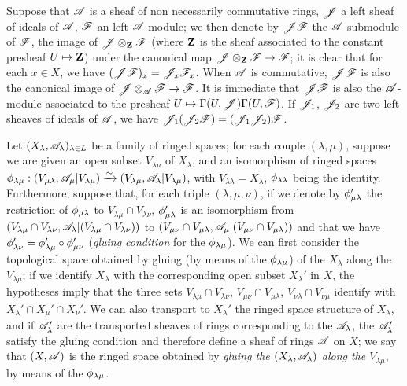 \begin{env}[4.1.6]
\label{0.4.1.6}
Suppose that $\mathscr{A}$ is a sheaf of non necessarily commutative rings, $\mathscr{J}$
a left sheaf of ideals of $\mathscr{A}$, $\mathscr{F}$ an left $\mathscr{A}$-module; we then
denote by $\mathscr{J}\mathscr{F}$ the $\mathscr{A}$-submodule of $\mathscr{F}$, the image of
$\mathscr{J}\otimes_\mathbf{Z}\mathscr{F}$ (where $\mathbf{Z}$ is the sheaf associated to the
constant presheaf $U\mapsto\mathbf{Z}$) under the canonical map
$\mathscr{J}\otimes_\mathbf{Z}\mathscr{F}\to\mathscr{F}$; it is clear that for each $x\in X$, we
have $(\mathscr{J}\mathscr{F})_x=\mathscr{J}_x\mathscr{F}_x$. When $\mathscr{A}$ is commutative,
$\mathscr{J}\mathscr{F}$ is also the canonical image of
$\mathscr{J}\otimes_\mathscr{A}\mathscr{F}\to\mathscr{F}$. It is immediate that $\mathscr{J}\mathscr{F}$ is
also the $\mathscr{A}$-module associated to the presheaf
$U\mapsto\Gamma(U,\mathscr{J})\Gamma(U,\mathscr{F})$. If $\mathscr{J}_1$, $\mathscr{J}_2$ are two
left sheaves of ideals of $\mathscr{A}$, we have
$\mathscr{J}_1(\mathscr{J}_2\mathscr{F})=(\mathscr{J}_1\mathscr{J}_2)\mathscr{F}$.
\end{env}

\begin{env}[4.1.7]
\label{0.4.1.7}
Let $(X_\lambda,\mathscr{A}_\lambda)_{\lambda\in L}$ be a family of ringed spaces;
for each couple $(\lambda,\mu)$, suppose we are given an open subset
$V_{\lambda\mu}$ of $X_\lambda$, and an isomorphism of ringed spaces
$\phi_{\lambda\mu}:(V_{\mu\lambda},\mathscr{A}_\mu|V_{\lambda\mu})
  \xrightarrow{\sim}(V_{\lambda\mu},\mathscr{A}_\lambda|V_{\lambda\mu})$, with
$V_{\lambda\lambda}=X_\lambda$, $\phi_{\lambda\lambda}$ being the identity.
Furthermore, suppose that, for each triple $(\lambda,\mu,\nu)$, if we denote by
$\phi_{\mu\lambda}'$ the restriction of $\phi_{\mu\lambda}$ to
$V_{\lambda\mu}\cap V_{\lambda\nu}$, $\phi_{\mu\lambda}'$ is an isomorphism
from $(V_{\lambda\mu}\cap V_{\lambda\nu},
  \mathscr{A}_\lambda|(V_{\lambda\mu}\cap V_{\lambda\nu}))$ to
$(V_{\mu\nu}\cap V_{\mu\lambda},\mathscr{A}_\mu|(V_{\mu\nu}\cap V_{\mu\lambda}))$ and
that we have $\phi_{\lambda\nu}'=\phi_{\lambda\mu}'\circ\phi_{\mu\nu}'$
(\emph{gluing condition} for the $\phi_{\lambda\mu}$). We can first consider
the topological space obtained by gluing (by means of the $\phi_{\lambda\mu}$)
of the $X_\lambda$
along the $V_{\lambda\mu}$; if we identify $X_\lambda$ with the corresponding
open subset $X_\lambda'$ in $X$, the hypotheses imply that the three sets
$V_{\lambda\mu}\cap V_{\lambda\nu}$, $V_{\mu\nu}\cap V_{\mu\lambda}$,
$V_{\nu\lambda}\cap V_{\nu\mu}$ identify with
$X_\lambda'\cap X_\mu'\cap X_\nu'$. We can also transport to $X_\lambda'$ the
ringed space structure of $X_\lambda$, and if $\mathscr{A}_\lambda'$ are the
transported sheaves of rings corresponding to the $\mathscr{A}_\lambda$, the
$\mathscr{A}_\lambda'$ satisfy the gluing condition  and therefore
define a sheaf of rings $\mathscr{A}$ on $X$; we say that $(X,\mathscr{A})$ is the ringed
space obtained by \emph{gluing the $(X_\lambda,\mathscr{A}_\lambda)$ along the
$V_{\lambda\mu}$}, by means of the $\phi_{\lambda\mu}$.
\end{env}

